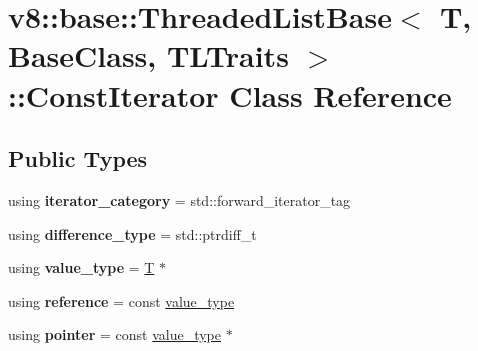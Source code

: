 \hypertarget{classv8_1_1base_1_1ThreadedListBase_1_1ConstIterator}{}\section{v8\+:\+:base\+:\+:Threaded\+List\+Base$<$ T, Base\+Class, T\+L\+Traits $>$\+:\+:Const\+Iterator Class Reference}
\label{classv8_1_1base_1_1ThreadedListBase_1_1ConstIterator}
\subsection*{Public Types}
\begin{DoxyCompactItemize}
\item 
\mbox{\label{classv8_1_1base_1_1ThreadedListBase_1_1ConstIterator_addffc2d57adc4725f4d42c6d5d802897}} 
using {\bfseries iterator\+\_\+category} = std\+::forward\+\_\+iterator\+\_\+tag
\item 
\mbox{\label{classv8_1_1base_1_1ThreadedListBase_1_1ConstIterator_a75081f1e55d2b326830fa8a6f2dccfaf}} 
using {\bfseries difference\+\_\+type} = std\+::ptrdiff\+\_\+t
\item 
\mbox{\label{classv8_1_1base_1_1ThreadedListBase_1_1ConstIterator_afdd660bff6be08fc7c43c253919cea77}} 
using {\bfseries value\+\_\+type} = \mbox{\hyperlink{classv8_1_1internal_1_1torque_1_1T}{T}} $\ast$
\item 
\mbox{\label{classv8_1_1base_1_1ThreadedListBase_1_1ConstIterator_a95255986846be82f8083619f1f80d248}} 
using {\bfseries reference} = const \mbox{\hyperlink{classv8_1_1internal_1_1torque_1_1T}{value\+\_\+type}}
\item 
\mbox{\label{classv8_1_1base_1_1ThreadedListBase_1_1ConstIterator_aa1497e8389adf4b0149d8527b757a02a}} 
using {\bfseries pointer} = const \mbox{\hyperlink{classv8_1_1internal_1_1torque_1_1T}{value\+\_\+type}} $\ast$
\end{DoxyCompactItemize}
